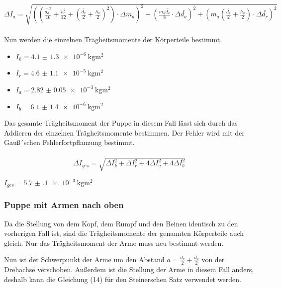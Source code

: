 $\Delta I_a = \sqrt{\left(\left(\frac{\bar{d_a}^2}{16} + \frac{h_a^2}{12} +
\left(\frac{\bar{d_r}}{2} + \frac{h_a}{2}\right)^2\right) \cdot \Delta m_a \right)^2
  + \left( \frac{m_a\bar{d_a}}{8} \cdot \Delta \bar{d_a} \right)^2
  + \left( m_a \left(\frac{\bar{d_r}}{2} + \frac{h_a}{2}\right) \cdot \Delta \bar{d_r} \right)^2}$\\\\

Nun werden die einzelnen Trägheitsmomente der Körperteile bestimmt.

\begin{itemize}
  \item $I_k = \SI{4.1(13)e-6}{\kilo\gram\meter\squared}$
  \item $I_r = \SI{4.6(11)e-5}{\kilo\gram\meter\squared}$
  \item $I_a = \SI{2.82(5)e-3}{\kilo\gram\meter\squared}$
  \item $I_b = \SI{6.1(14)e-6}{\kilo\gram\meter\squared}$
\end{itemize}

Das gesamte Trägheitsmoment der Puppe in diesem Fall lässt sich durch das Addieren
der einzelnen Trägheitsmomente bestimmen. Der Fehler wird mit der Gauß´schen Fehlerfortpflanzung
bestimmt. \\\\

\begin{equation}
\Delta I_{ges} = \sqrt{\Delta I_k^2 + \Delta I_r^2 + 4\Delta I_a^2 + 4\Delta I_b^2}
\end{equation}

\centerline{$I_{ges} = \SI{5.7(1)e-3}{\kilo\gram\meter\squared}$}

\subsubsection{Puppe mit Armen nach oben}

Da die Stellung von dem Kopf, dem Rumpf und den Beinen identisch zu den vorherigen
Fall ist, sind die Trägheitsmomente der genannten Körperteile auch gleich.
Nur das Trägheitsmoment der Arme muss neu bestimmt werden.

Nun ist der Schwerpunkt der Arme um den Abstand $a = \frac{d_r}{2} + \frac{d_a}{2}$
von der Drehachse verschoben. Außerdem ist die Stellung der Arme in diesem Fall anders,
deshalb kann die Gleichung (14) für den Steinerschen Satz verwendet werden.\\\\

